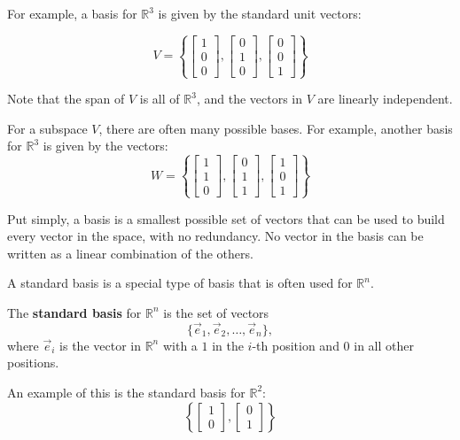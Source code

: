 For example, a basis for $\mathbb{R}^3$ is given by the standard unit vectors:

\[V=\left\{
    \begin{bmatrix}1 \\ 0 \\ 0\end{bmatrix},
\begin{bmatrix}0 \\ 1 \\ 0\end{bmatrix},
\begin{bmatrix}0 \\ 0 \\ 1\end{bmatrix}
\right\}\]

Note that the span of $V$ is all of $\mathbb{R}^3$, and the vectors in $V$ are linearly independent.

For a subspace $V$, there are often many possible bases. For example, another basis for $\mathbb{R}^3$ is given by the vectors:
\[W=\left\{
\begin{bmatrix}1 \\ 1 \\ 0\end{bmatrix},
\begin{bmatrix}0 \\ 1 \\ 1\end{bmatrix},
\begin{bmatrix}1 \\ 0 \\ 1\end{bmatrix}
\right\}\]


Put simply, a basis is a smallest possible set of vectors that can be used to build every vector in the space, with no redundancy. No vector in the basis can be written as a linear combination of the others.

A standard basis is a special type of basis that is often used for $\mathbb{R}^n$.
\begin{mdframed}[frametitle = {Standard Basis}, style = important]
The \textbf{standard basis} for $\mathbb{R}^n$ is the set of vectors
\[
\{\vec e_1, \vec e_2, \ldots, \vec e_n\},
\]
where $\vec e_i$ is the vector in $\mathbb{R}^n$ with a $1$ in the $i$-th position and $0$ in all other positions.
\end{mdframed}

An example of this is the standard basis for $\mathbb{R}^2$:
\[\left\{
\begin{bmatrix}1 \\ 0\end{bmatrix},
\begin{bmatrix}0 \\ 1\end{bmatrix}
\right\}\]

